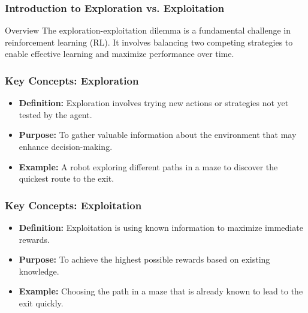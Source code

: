 \documentclass[aspectratio=169]{beamer}
\begin{document}
\frame{\titlepage}

\begin{frame}[fragile]
    \frametitle{Introduction to Exploration vs. Exploitation}
    \begin{block}{Overview}
        The exploration-exploitation dilemma is a fundamental challenge in reinforcement learning (RL). It involves balancing two competing strategies to enable effective learning and maximize performance over time.
    \end{block}
\end{frame}

\begin{frame}[fragile]
    \frametitle{Key Concepts: Exploration}

    \begin{itemize}
        \item \textbf{Definition:} Exploration involves trying new actions or strategies not yet tested by the agent.
        \item \textbf{Purpose:} To gather valuable information about the environment that may enhance decision-making.
        \item \textbf{Example:} A robot exploring different paths in a maze to discover the quickest route to the exit.
    \end{itemize}
\end{frame}

\begin{frame}[fragile]
    \frametitle{Key Concepts: Exploitation}

    \begin{itemize}
        \item \textbf{Definition:} Exploitation is using known information to maximize immediate rewards.
        \item \textbf{Purpose:} To achieve the highest possible rewards based on existing knowledge.
        \item \textbf{Example:} Choosing the path in a maze that is already known to lead to the exit quickly.
    \end{itemize}
\end{frame}
\end{document}
